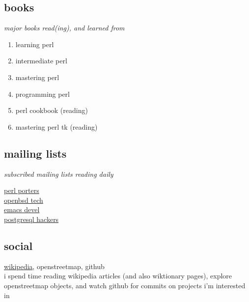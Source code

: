 \documentclass{article}
\begin{document}
    \subsection{books}
      \textit{major books read(ing), and learned from}
      \begin{enumerate}
        \item{learning perl\cite{learning_perl}}
        \item{intermediate perl\cite{intermediate_perl}}
        \item{mastering perl\cite{mastering_perl}}
        \item{programming perl\cite{programming_perl}}
        \item{perl cookbook\cite{perl_cookbook}} (reading)
        \item{mastering perl tk\cite{perl_tk}} (reading)
      \end{enumerate}
    \subsection{mailing lists}
      \textit{subscribed mailing lists reading daily}
      \begin{description}
        \item[\href{https://lists.perl.org/list/perl5-porters.html}{perl porters}]
        \item[\href{https://www.openbsd.org/mail.html}{openbsd tech}]
        \item[\href{https://lists.gnu.org/mailman/listinfo/emacs-devel}{emacs devel}]
        \item[\href{https://www.postgresql.org/list/pgsql-hackers/}{postgresql hackers}]
      \end{description}
    \subsection{social}
    \href{https://en.wikipedia.org/wiki/User:Rwp0}{wikipedia}, openstreetmap, github\\
    i spend time reading wikipedia articles (and also wiktionary pages), explore openstreetmap objects, and watch github for commits  on projects i'm interested in
  {} %
\end{document}
